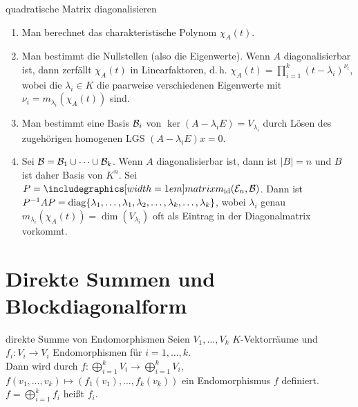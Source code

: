\begin{Prozedur}{quadratische Matrix diagonalisieren}
    \begin{enumerate}
        \item Man berechnet das charakteristische Polynom $\chi_A(t)$.

        \item Man bestimmt die Nullstellen (also die Eigenwerte).
        Wenn $A$ diagonalisierbar ist, dann zerfällt $\chi_A(t)$ in
        Linearfaktoren, d.\,h.
        $\chi_A(t) = \prod_{i=1}^k (t - \lambda_i)^{\nu_i}$,
        wobei die $\lambda_i \in K$ die paarweise verschiedenen Eigenwerte
        mit $\nu_i = m_{\lambda_i}(\chi_A(t))$ sind.

        \item Man bestimmt eine Basis $\mathcal{B}_i$ von
        $\ker(A - \lambda_i E) = V_{\lambda_i}$ durch
        Lösen des zugehörigen homogenen LGS $(A - \lambda_i E)x = 0$.

        \item Sei $\mathcal{B} = \mathcal{B}_1 \cup \cdots \cup \mathcal{B}_k$.
        Wenn $A$ diagonalisierbar ist, dann ist $|B| = n$ und $B$ ist daher
        Basis von $K^n$.
        Sei $P = \hommatrix{\id}{\stdbasis{n}}{B}$.
        Dann ist $P^{-1}AP = \operatorname{diag}\{\lambda_1, \ldots, \lambda_1, \lambda_2,
        \ldots, \lambda_k, \ldots, \lambda_k\}$, wobei
        $\lambda_i$ genau $m_{\lambda_i}(\chi_A(t)) = \dim(V_{\lambda_i})$
        oft als Eintrag in der Diagonalmatrix vorkommt.
    \end{enumerate}
\end{Prozedur}

\section{%
    Direkte Summen und Blockdiagonalform%
}

\begin{Def}{direkte Summe von Endomorphismen}
    Seien $V_1, \ldots, V_k$ $K$-Vektorräume und $f_i: V_i \rightarrow V_i$
    Endomorphismen für $i = 1, \ldots, k$. \\
    Dann wird durch $f: \bigoplus_{i=1}^k V_i \rightarrow
    \bigoplus_{i=1}^k V_i$, $f(v_1, \ldots, v_k) \mapsto
    (f_1(v_1), \ldots, f_k(v_k))$ ein Endomorphismus $f$ definiert.
    $f = \bigoplus_{i=1}^k f_i$ heißt
     $f_i$.
\end{Def}

